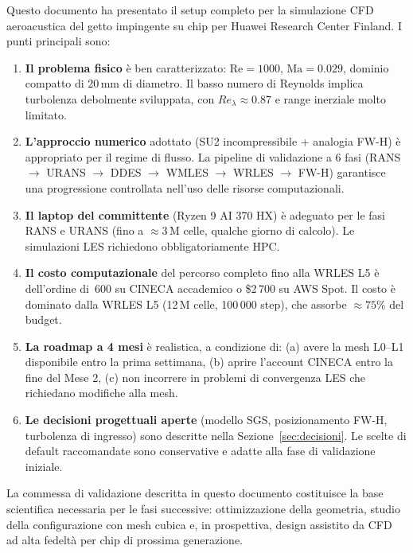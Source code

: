 \documentclass[11pt,a4paper]{article}
\newcommand{\Rey}{\mathrm{Re}}
\newcommand{\Ma}{\mathrm{Ma}}
\begin{document}
Questo documento ha presentato il setup completo per la simulazione CFD aeroacustica del getto impingente su chip per Huawei Research Center Finland. I punti principali sono:

\begin{enumerate}
  \item \textbf{Il problema fisico} è ben caratterizzato: $\Rey = 1000$, $\Ma = 0.029$, dominio compatto di 20\,mm di diametro. Il basso numero di Reynolds implica turbolenza debolmente sviluppata, con $Re_\lambda \approx 0.87$ e range inerziale molto limitato.

  \item \textbf{L'approccio numerico} adottato (SU2 incompressibile + analogia FW-H) è appropriato per il regime di flusso. La pipeline di validazione a 6 fasi (RANS $\rightarrow$ URANS $\rightarrow$ DDES $\rightarrow$ WMLES $\rightarrow$ WRLES $\rightarrow$ FW-H) garantisce una progressione controllata nell'uso delle risorse computazionali.

  \item \textbf{Il laptop del committente} (Ryzen 9 AI 370 HX) è adeguato per le fasi RANS e URANS (fino a $\approx 3$\,M celle, qualche giorno di calcolo). Le simulazioni LES richiedono obbligatoriamente HPC.

  \item \textbf{Il costo computazionale} del percorso completo fino alla WRLES L5 è dell'ordine di \,600 su CINECA accademico o \$2\,700 su AWS Spot. Il costo è dominato dalla WRLES L5 (12\,M celle, 100\,000 step), che assorbe $\approx 75\%$ del budget.

  \item \textbf{La roadmap a 4 mesi} è realistica, a condizione di: (a) avere la mesh L0--L1 disponibile entro la prima settimana, (b) aprire l'account CINECA entro la fine del Mese 2, (c) non incorrere in problemi di convergenza LES che richiedano modifiche alla mesh.

  \item \textbf{Le decisioni progettuali aperte} (modello SGS, posizionamento FW-H, turbolenza di ingresso) sono descritte nella Sezione~\ref{sec:decisioni}. Le scelte di default raccomandate sono conservative e adatte alla fase di validazione iniziale.
\end{enumerate}

La commessa di validazione descritta in questo documento costituisce la base scientifica necessaria per le fasi successive: ottimizzazione della geometria, studio della configurazione con mesh cubica e, in prospettiva, design assistito da CFD ad alta fedeltà per chip di prossima generazione.
\end{document}
